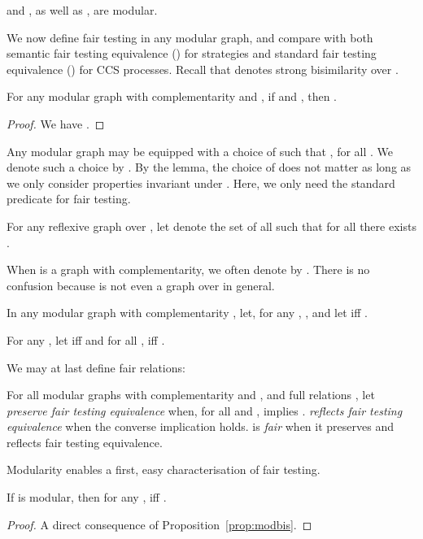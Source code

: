 \documentclass{LMCS}
\theoremstyle{plain}\newtheorem{satz}[thm]{Satz}
\begin{document}
\begin{exa}
   and , as well as , are modular.
\end{exa}

We now define fair testing in any modular graph, and compare with both
semantic fair testing equivalence () for strategies and
standard fair testing equivalence () for CCS processes.
Recall that  denotes strong bisimilarity over .
\begin{lem}
  For any modular graph with complementarity  and , if  and , then .
\end{lem}
\begin{proof}
  We have .
\end{proof}

Any modular graph may be equipped with a choice of  such that
, for all . We denote such a choice by
. By the lemma, the choice of  does not matter as long as we
only consider properties invariant under .  Here, we only
need the standard predicate for fair testing.

\begin{defi}
  For any reflexive graph  over , let  denote the set of all
   such that for all  there exists .
\end{defi}
When  is a graph with complementarity,
we often denote  by . There is no confusion because 
 is not even a graph over  in general.

In any modular graph with complementarity , let, for any ,
, and let 
iff .
\begin{defi}
  For any , let  iff  and
  for all ,  iff .
\end{defi}

We may at last define fair relations:
\begin{defi}\label{def:fairrel}
  For all modular graphs with complementarity  and , and full
  relations , let  \emph{preserve fair testing
    equivalence} when, for all  and ,  implies .   \emph{reflects
    fair testing equivalence} when the converse implication holds.
   is \emph{fair} when it preserves and reflects fair testing
  equivalence.
\end{defi}

Modularity enables a first, easy characterisation of fair testing.
\begin{prop}
  If  is modular, then for any ,  iff
  .
\end{prop}
\begin{proof}
A direct consequence of Proposition~\ref{prop:modbis}.
\end{proof}
\end{document}
